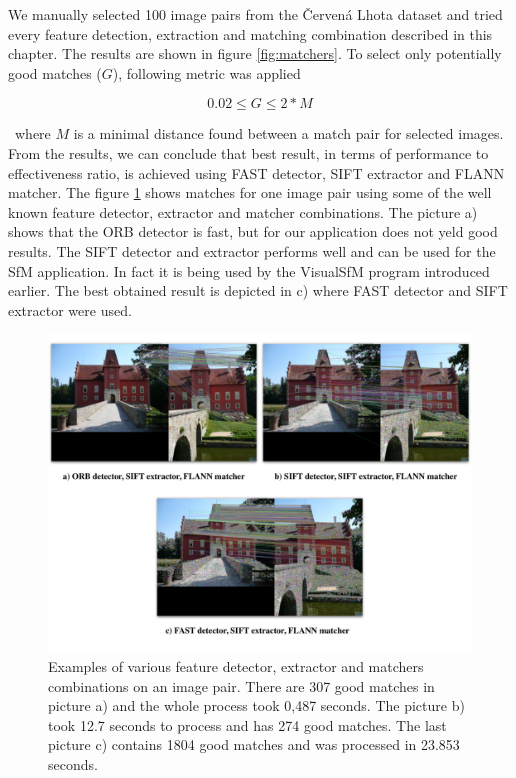We manually selected 100 image pairs from the Červená Lhota dataset and tried every feature detection, extraction and matching combination described in this chapter. The results are shown in figure \ref{fig:matchers}. To select only potentially good matches ($G$), following metric was applied

\begin{equation}
	0.02 \leq G \leq 2* M
\end{equation}

\ where $M$ is a minimal distance found between a match pair for selected images. From the results, we can conclude that best result, in terms of performance to effectiveness ratio, is achieved using FAST detector, SIFT extractor and FLANN matcher. The figure \ref{fig:matches} shows matches for one image pair using some of the well known feature detector, extractor and matcher combinations. The picture a) shows that the ORB detector is fast, but for our application does not yeld good results. The SIFT detector and extractor performs well and can be used for the SfM application. In fact it is being used by the VisualSfM program introduced earlier. The best obtained result is depicted in c) where FAST detector and SIFT extractor were used.

\begin{figure}[ht]
	\begin{center}
		\includegraphics[keepaspectratio,width=\textwidth]{fig/matches.pdf}
	\end{center}
	\caption{Examples of various feature detector, extractor and matchers combinations on an image pair. There are 307 good matches in picture a) and the whole process took 0,487 seconds. The picture b) took 12.7 seconds to process and has 274 good matches. The last picture c) contains 1804 good matches and was processed in 23.853 seconds.}
	\label{fig:matches}
\end{figure}

